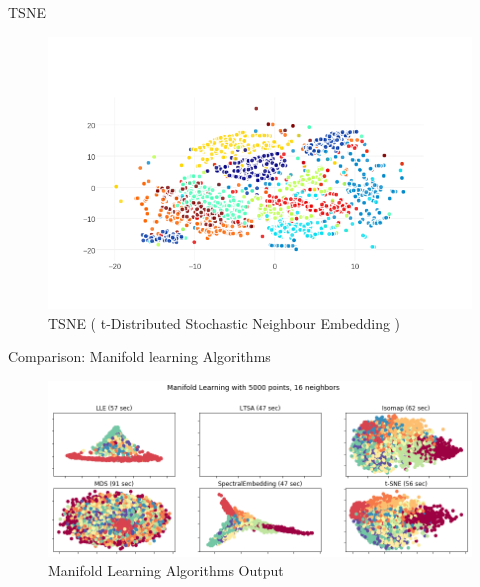 \documentclass{beamer}
\theoremstyle{plain}
\theoremstyle{definition}
\theoremstyle{plain}
\theoremstyle{plain}
\begin{document}
\begin{frame}{TSNE}
\begin{figure}[h!]
\begin{center}
\includegraphics[width=\textwidth]{./Figures/tsne.png}
\caption {TSNE ( t-Distributed Stochastic Neighbour Embedding )}
\label{tsne} 
\end{center}
\end{figure}
\end{frame}
\begin{frame}{Comparison: Manifold learning Algorithms}

\begin{figure}[h!]
\begin{center}
\includegraphics[width=\textwidth]{./Figures/AML.png}
\caption {Manifold Learning Algorithms Output}
\label{AML} 
\end{center}
\end{figure}
\end{frame}
\end{document}
